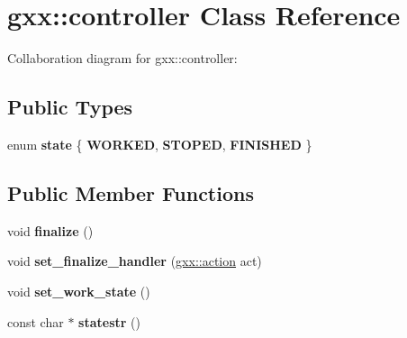 \hypertarget{classgxx_1_1controller}{}\section{gxx\+:\+:controller Class Reference}
\label{classgxx_1_1controller}


Collaboration diagram for gxx\+:\+:controller\+:
\subsection*{Public Types}
\begin{DoxyCompactItemize}
\item 
enum {\bfseries state} \{ {\bfseries W\+O\+R\+K\+ED}, 
{\bfseries S\+T\+O\+P\+ED}, 
{\bfseries F\+I\+N\+I\+S\+H\+ED}
 \}\hypertarget{classgxx_1_1controller_ac07045ccbd72c2b4de4636962487c876}{}\label{classgxx_1_1controller_ac07045ccbd72c2b4de4636962487c876}

\end{DoxyCompactItemize}
\subsection*{Public Member Functions}
\begin{DoxyCompactItemize}
\item 
void {\bfseries finalize} ()\hypertarget{classgxx_1_1controller_ae34771ff9211cc037081c47df5ff53ce}{}\label{classgxx_1_1controller_ae34771ff9211cc037081c47df5ff53ce}

\item 
void {\bfseries set\+\_\+finalize\+\_\+handler} (\hyperlink{classgxx_1_1delegate}{gxx\+::action} act)\hypertarget{classgxx_1_1controller_aa078f0e51f2a6ea029c914a84bdbbac8}{}\label{classgxx_1_1controller_aa078f0e51f2a6ea029c914a84bdbbac8}

\item 
void {\bfseries set\+\_\+work\+\_\+state} ()\hypertarget{classgxx_1_1controller_a06d38fbd0f11938c16c94299db8201e1}{}\label{classgxx_1_1controller_a06d38fbd0f11938c16c94299db8201e1}

\item 
const char $\ast$ {\bfseries statestr} ()\hypertarget{classgxx_1_1controller_aadf433685594ab166f94a6cef80845f2}{}\label{classgxx_1_1controller_aadf433685594ab166f94a6cef80845f2}

\end{DoxyCompactItemize}
